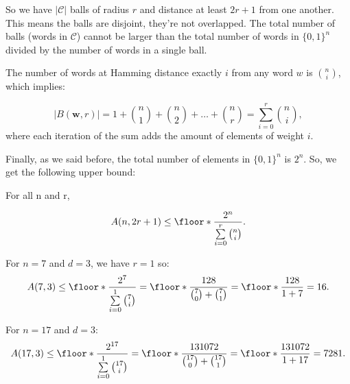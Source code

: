 So we have $|\mathcal{C}|$ balls of radius $r$ and distance at least $2r+1$ from one another. This means the balls are disjoint, they're not overlapped. The total number of balls (words in $\mathcal{C}$) cannot be larger than the total number of words in $\{0,1\}^n$  divided by the number of words in a single ball.

The number of words at Hamming distance exactly $i$ from any word $w$ is ${n \choose i}$, which implies:

\begin{equation}
    |B(\mathbf{w}, r)| = 1 + {n \choose 1} + {n \choose 2} + \dots + {n \choose r} = \sum_{i=0}^{r} {n \choose i},
\end{equation}
where each iteration of the sum adds the amount of elements of weight $i$.

Finally, as we said before, the total number of elements in $\{0,1\}^n$ is $2^n$. So, we get the following upper bound:

\begin{lemma}
    For all n and r,

    \begin{equation}
        A(n, 2r+1) \leq \floor*{\frac{2^n}{\sum\limits_{i=0}^{r}{n \choose i}}}.
    \end{equation}
\end{lemma}

\begin{example}
    For $n=7$ and $d=3$, we have $r=1$ so:
    \begin{equation}
        A(7,3) \leq \floor*{\frac{2^7}{\sum\limits_{i=0}^{1}{7 \choose i}}} = \floor*{\frac{128}{{7 \choose 0} + {7 \choose 1}}} = \floor*{\frac{128}{1 + 7}} = 16.
    \end{equation}
\end{example}

\begin{example}
    For $n=17$ and $d=3$:
    \begin{equation}
        A(17,3) \leq \floor*{\frac{2^{17}}{\sum\limits_{i=0}^{1}{17 \choose i}}} = \floor*{\frac{131072}{{17 \choose 0} + {17 \choose 1}}} = \floor*{\frac{131072}{1 + 17}} = 7281.
    \end{equation}
\end{example}

